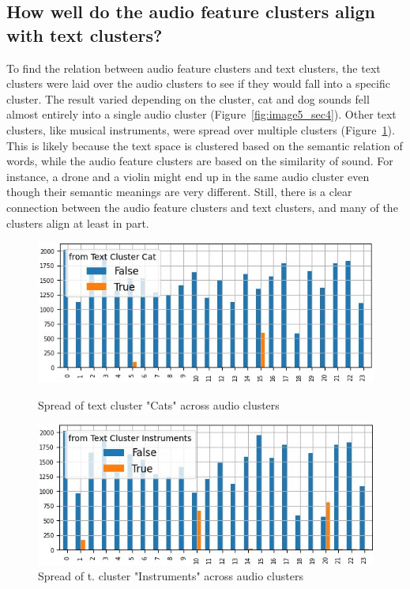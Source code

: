 \subsection{How well do the audio feature clusters align with text clusters?}
\label{sec:Text Features:c}


To find the relation between audio feature clusters and text clusters, the text clusters were laid over the audio clusters to see if they would fall into a specific cluster. The result varied depending on the cluster, cat and dog sounds fell almost entirely into a single audio cluster (Figure~\ref{fig:image5_sec4}). Other text clusters, like musical instruments, were spread over multiple clusters (Figure~\ref{fig:image6_sec4}). \\
This is likely because the text space is clustered based on the semantic relation of words, while the audio feature clusters are based on the similarity of sound. For instance, a drone and a violin might end up in the same audio cluster even though their semantic meanings are very different. 
Still, there is a clear connection between the audio feature clusters and text clusters, and many of the clusters align at least in part.

\begin{figure}[ht]
  \centering
  \begin{minipage}[b]{0.49\textwidth}
    \centering
    \includegraphics[width=\textwidth]{figs/cat_test_cluster_over_audio_cluster.jpg}
    \caption{Spread of text cluster "Cats" across audio clusters}
    \label{fig:image5_sec4}
  \end{minipage}
  \hfill
  \begin{minipage}[b]{0.49\textwidth}
    \centering
    \includegraphics[width=\textwidth]{figs/instruments_test_cluster_over_audio_cluster.jpg}
    \caption{Spread of t. cluster "Instruments" across audio clusters}
    \label{fig:image6_sec4}
  \end{minipage}
 \end{figure}

